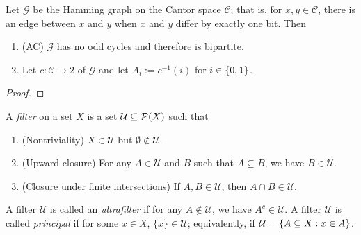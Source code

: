 \documentclass[10pt]{article}
\begin{document}
\begin{proposition}[Exercise 42]
    Let $\mathcal{G}$ be the Hamming graph on the Cantor space $\mathcal{C}$; that is, for $x,y \in \mathcal{C}$, there is an edge between $x$ and $y$ when $x$ and $y$ differ by exactly one bit.
    Then
    \begin{enumerate}
        \item (AC) $\mathcal{G}$ has no odd cycles and therefore is bipartite.
        \item Let $c : \mathcal{C} \to 2$ of $\mathcal{G}$ and let $A_i := c^{-1}(i)$ for $i \in {\left\{ {0,1} \right\}}$.
    \end{enumerate}
\end{proposition}
\begin{proof}
\end{proof}

\begin{definition}
    A \emph{filter} on a set $X$ is a set $\mathcal{U} \subseteq \mathcal{P}{\left( {X} \right)}$ such that
    \begin{enumerate}[label=(\roman*)]
        \item (Nontriviality) $X \in \mathcal{U}$ but $\emptyset \not\in \mathcal{U}$.
        \item (Upward closure) For any $A \in \mathcal{U}$ and $B$ such that $A \subseteq B$, we have $B \in \mathcal{U}$.
        \item (Closure under finite intersections) If $A, B \in \mathcal{U}$, then $A \cap B \in \mathcal{U}$.
    \end{enumerate}

    A filter $\mathcal{U}$ is called an \emph{ultrafilter} if for any $A \not\in \mathcal{U}$, we have $A^c \in \mathcal{U}$.
    A filter $\mathcal{U}$ is called \emph{principal} if for some $x \in X$, $\{x\} \in \mathcal{U}$; equivalently, if $\mathcal{U} = \left\{ {A \subseteq X} : {x \in A} \right\}$.
\end{definition}
\end{document}
